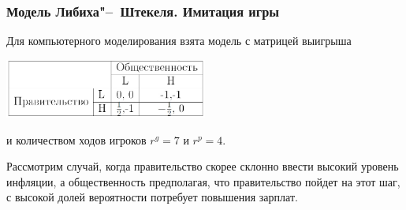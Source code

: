 \documentclass {beamer}
\begin{document}
\begin{frame}
\frametitle{Модель Либиха"--~Штекеля. Имитация игры}
	Для компьютерного моделирования взята модель с матрицей выигрыша
	  \begin{center}
	  	\includegraphics[width=0.5\textwidth]{second}
	  \end{center}
	и количеством ходов игроков $r^g= 7$ и $r^p= 4$.
	
	Рассмотрим случай, когда правительство скорее склонно ввести высокий
	уровень инфляции, а общественность предполагая, что правительство
	пойдет на этот шаг, с высокой долей вероятности потребует повышения зарплат.	
\end{frame}
\end{document}
